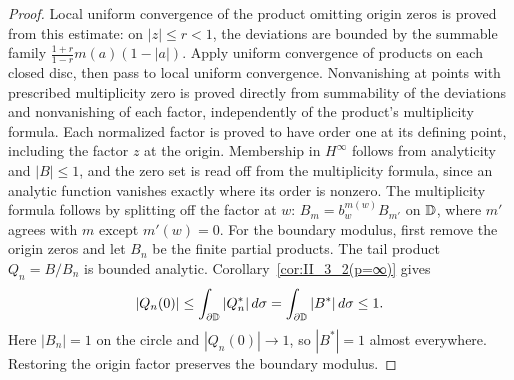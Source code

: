 \begin{theorem}
\begin{proof}
    Local uniform convergence of the product omitting origin zeros is proved
    from this estimate: on $|z|\le r<1$, the deviations are bounded by the
    summable family $\frac{1+r}{1-r}m(a)(1-|a|)$. Apply uniform convergence
    of products on each closed disc, then pass to local uniform convergence.
    Nonvanishing at points with prescribed multiplicity zero is proved directly
    from summability of the deviations and nonvanishing of each factor, independently
    of the product's multiplicity formula. Each normalized factor is proved to have
    order one at its defining point, including the factor $z$ at the origin.
    Membership in $H^\infty$ follows from analyticity and $|B|\le1$, and
    the zero set is read off from the multiplicity formula, since an analytic
    function vanishes exactly where its order is nonzero.
    The multiplicity formula follows by splitting off the factor at $w$:
    $B_m=b_w^{m(w)}B_{m'}$ on $\mathbb{D}$, where $m'$ agrees with $m$ except $m'(w)=0$.
    For the boundary modulus, first remove the origin zeros and let $B_n$
    be the finite partial products. The tail product $Q_n=B/B_n$ is bounded
    analytic. Corollary~\ref{cor:II_3_2(p=∞)} gives
    \[
      |Q_n(0)|\le\int_{\partial\mathbb{D}}|Q_n^*|\,d\sigma
      =\int_{\partial\mathbb{D}}|B^*|\,d\sigma\le1.
    \]
    Here $|B_n|=1$ on the circle and $|Q_n(0)|\to1$, so $|B^*|=1$
    almost everywhere. Restoring the origin factor preserves the boundary modulus.
  \end{proof}
\end{theorem}

